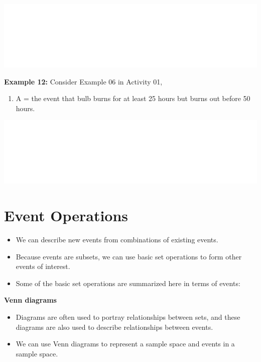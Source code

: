 \documentclass[]{book}
\providecommand{\tightlist}{%
  \setlength{\itemsep}{0pt}\setlength{\parskip}{0pt}}
\begin{document}
\begin{center}\includegraphics[width=1\linewidth]{figure/box72e-1} \end{center}

\textbf{Example 12:} Consider Example 06 in Activity 01,

\begin{enumerate}
\def\labelenumi{\alph{enumi})}
\tightlist
\item
  A = the event that bulb burns for at least 25 hours but burns out before 50 hours.
\end{enumerate}

\begin{center}\includegraphics[width=1\linewidth]{figure/box72f-1} \end{center}

\hypertarget{event-operations}{%
\section{Event Operations}\label{event-operations}}

\begin{itemize}
\tightlist
\item
  We can describe new events from combinations of existing events.
\item
  Because events are subsets, we can use basic set operations to form other events of interest.
\item
  Some of the basic set operations are summarized here in terms of events:
\end{itemize}

\textbf{Venn diagrams}

\begin{itemize}
\tightlist
\item
  Diagrams are often used to portray relationships between sets, and these diagrams are also used to describe relationships between events.
\item
  We can use Venn diagrams to represent a sample space and events in a sample space.
\end{itemize}
\end{document}
